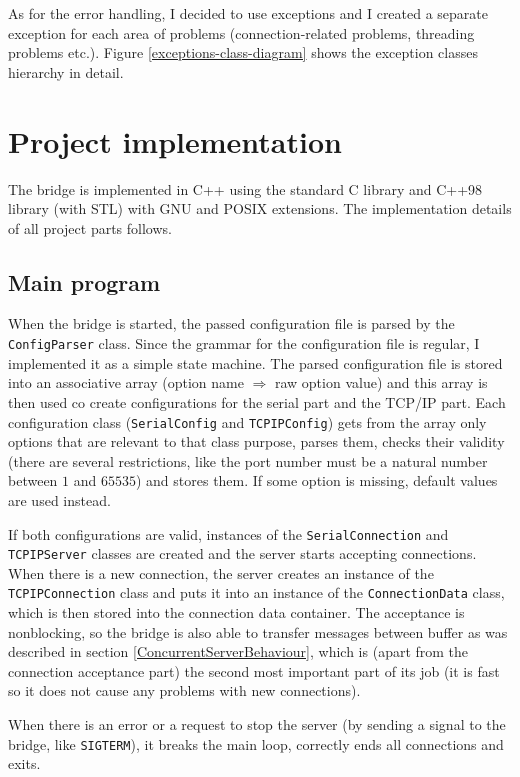 As for the error handling, I decided to use exceptions and I created a separate
exception for each area of problems (connection-related problems, threading
problems etc.).
Figure \ref{exceptions-class-diagram} shows the exception classes hierarchy in detail.

\section{Project implementation}

The bridge is implemented in C++ using the standard C library and C++98 library
(with STL) with GNU and POSIX extensions. The implementation details of all
project parts follows.

\subsection{Main program}

When the bridge is started, the passed configuration file is parsed
by the \texttt{ConfigParser} class. Since the grammar for the configuration file
is regular, I implemented it as a simple state machine. The parsed configuration
file is stored into an associative array (option name $\Rightarrow$ raw option value)
and this array is then used co create configurations for the serial part
and the TCP/IP part. Each configuration class (\texttt{SerialConfig} and
\texttt{TCPIPConfig}) gets from the array only options that are relevant to that
class purpose, parses them, checks their validity (there are several restrictions,
like the port number must be a natural number between $1$ and $65535$) and
stores them. If some option is missing, default values are used instead.

If both configurations are valid, instances of the \texttt{SerialConnection}
and \texttt{TCPIPServer} classes are created and the server starts accepting
connections. When there is a new connection, the server creates an instance of
the \texttt{TCPIPConnection} class and puts it into an instance of the
\texttt{ConnectionData} class, which is then stored into the connection data container.
The acceptance is nonblocking, so the bridge is also able to
transfer messages between buffer as was described in section \ref{ConcurrentServerBehaviour},
which is (apart from the connection acceptance part) the second most important
part of its job (it is fast so it does not cause any problems with new connections).

When there is an error or a request to stop the server (by sending a signal to
the bridge, like \texttt{SIGTERM}), it breaks the main loop, correctly ends
all connections and exits.

